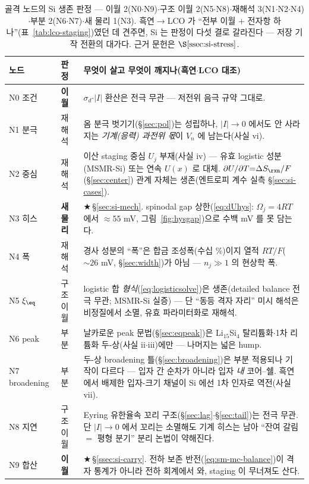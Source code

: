 \begin{table}[h]
\centering
\small
\begin{tabular}{p{} p{} p{}}
\toprule
노드 & 판정 & 무엇이 살고 무엇이 깨지나(흑연$\cdot$LCO 대조) \\
\midrule
N0 조건 & \textbf{이월} & $\sigma_d$$\cdot$$|I|$ 환산은 전극 무관 --- 저전위 음극 규약 그대로. \\
N1 분극 & 재해석 & 옴 분극 벗기기(\S\ref{sec:pol})는 성립하나, $|I|\!\to\!0$ 에서도 안 사라지는 \emph{기계(응력) 과전위 몫}이 $V_n$ 에 남는다(사실 vi). \\
N2 중심 & 재해석 & 이산 staging 중심 $U_j$ 부재(사실 iv) --- 유효 logistic 성분(MSMR-Si\cite{verbrugge_lisi2016}) 또는 연속 $U(x)$\cite{chevrier_dahn2009} 로 대체. $\partial U/\partial T{=}\Delta S_\rxn/F$(\S\ref{sec:center}) 관계 자체는 생존(엔트로피 계수 실측 \S\ref{sec:si-cases}). \\
N3 히스 & \textbf{새 물리} & $\bigstar$\,\S\ref{sec:si-mech}. spinodal gap 상한(\eqref{eq:dUhys}: $\Omega_j{=}4RT$ 에서 $\approx55$ mV, 그림~\ref{fig:hysgap})으로 수백 mV 를 못 담는다. \\
N4 폭 & 재해석 & 경사 성분의 ``폭''은 합금 조성폭(수십 \%)이지 열적 $RT/F$($\sim26$ mV, \S\ref{sec:width})가 아님 --- $n_j\!\gg\!1$ 의 현상학 폭. \\
N5 $\xi_\eq$ & 구조 이월 & logistic 합 \emph{형식}(\eqref{eq:logisticsolve})은 생존(detailed balance 전극 무관; MSMR-Si 실증) --- 단 ``동등 격자 자리'' 미시 해석은 비정질에서 소멸, 유효 파라미터화로 재해석. \\
N6 peak & 부분 & 날카로운 peak 문법(\S\ref{sec:eqpeak})은 Li$_{15}$Si$_4$ 탈리튬화$\cdot$1차 리튬화 두-상(사실 ii$\cdot$iii)에만 --- 나머지는 넓은 hump. \\
N7 broadening & 부분 & 두-상 broadening 틀(\S\ref{sec:broadening})은 부분 적용되나 기작이 다르다 --- 입자 간 순차가 아니라 입자 \emph{내} 코어--쉘. 흑연에서 배제한 입자-크기 채널이 Si 에선 1차 인자로 역전(사실 vii). \\
N8 지연 & 구조 이월 & Eyring 유한율속 꼬리 구조(\S\ref{sec:lag}$\cdot$\S\ref{sec:tail})는 전극 무관. 단 $|I|\!\to\!0$ 에서 꼬리는 소멸해도 기계 히스는 남아 ``잔여 갈림 $=$ 평형 분기'' 분리 논법이 약해진다. \\
N9 합산 & \textbf{이월} & $\bigstar$\,\S\ref{ssec:si-carry}. 전하 보존 반전(\eqref{eq:sm-mc-balance})이 격자 통계가 아니라 전하 회계에서 와, staging 이 무너져도 산다. \\
\bottomrule
\end{tabular}
\caption{골격 노드의 Si 생존 판정 --- 이월 2(N0$\cdot$N9)$\cdot$구조 이월 2(N5$\cdot$N8)$\cdot$재해석
3(N1$\cdot$N2$\cdot$N4)$\cdot$부분 2(N6$\cdot$N7)$\cdot$새 물리 1(N3). 흑연$\to$LCO 가 ``전부 이월 $+$
전자항 하나''(표~\ref{tab:lco-staging})였던 데 견주면, Si 는 판정이 다섯 결로 갈라진다 --- 저장 기작
전환의 대가다. 근거 문헌은 $\S\ref{ssec:si-stress}$.}
\label{tab:si-survival}
\end{table}

